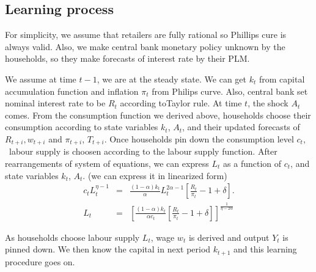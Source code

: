 \documentclass{article}
\begin{document}
\subsection{Learning process}

For simplicity, we assume that retailers are fully rational so Phillips cure
is always valid. Also, we make central bank monetary policy unknown by the
households, so they make forecasts of interest rate by their PLM.

We assume at time $t-1$, we are at the steady state. We can get $k_{t}$ from
capital accumulation function and inflation $\pi _{t}$ from Philips curve.
Also, central bank set nominal interest rate to be $R_{t}$ according
toTaylor rule. At time $t$, the shock $A_{t}$ comes. From the consumption
function we derived above, households choose their consumption according to
state variables $k_{t}$, $A_{t}$, and their updated forecasts of $%
R_{t+i},w_{t+i}$ and $\pi _{t+i}$, $T_{t+i}$. Once households pin down the
consumption level $c_{t}$, \ labour supply is choosen according to the
labour supply function. After rearrangements of system of equations, we can
express $L_{t}$ as a function of $c_{t}$, and state variables $k_{t}$, $A_{t}
$. (we can express it in linearized form)%
\begin{eqnarray*}
c_{t}L_{t}^{\eta -1} &=&\frac{\left( 1-\alpha \right) k_{t}}{\alpha }%
L_{t}^{2\alpha -1}\left[ \frac{R_{t}}{\pi _{t}}-1+\delta \right] . \\
L_{t} &=&\left[ \frac{\left( 1-\alpha \right) k_{t}}{\alpha c_{t}}\left[ 
\frac{R_{t}}{\pi _{t}}-1+\delta \right] \right] ^{\frac{1}{\eta -2\alpha }}
\end{eqnarray*}

As households choose labour supply $L_{t}$, wage $w_{t}$ is derived and
output $Y_{t}$ is pinned down. We then know the capital in next period $%
k_{t+1}$ and this learning procedure goes on.
\end{document}
